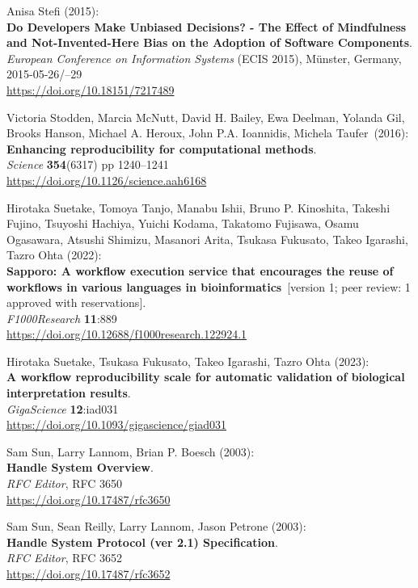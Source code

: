\begin{thebibliography}{9}
Anisa Stefi (2015): \\
\textbf{Do Developers Make Unbiased Decisions? - The Effect of Mindfulness and Not-Invented-Here Bias on the Adoption of Software Components}. \\
\emph{European Conference on Information Systems} (ECIS 2015), Münster, Germany, 2015-05-26/--29 \\
\url{https://doi.org/10.18151/7217489}

Victoria Stodden, Marcia McNutt, David H. Bailey, Ewa Deelman,
Yolanda Gil, Brooks Hanson, Michael A. Heroux, John P.A. Ioannidis,
Michela Taufer~(2016):\\
\textbf{Enhancing reproducibility for computational methods}.\\
\emph{Science} \textbf{354}(6317) pp 1240--1241\\
\url{https://doi.org/10.1126/science.aah6168}

Hirotaka Suetake, Tomoya Tanjo, Manabu Ishii, Bruno
P. Kinoshita, Takeshi Fujino, Tsuyoshi Hachiya, Yuichi Kodama, Takatomo
Fujisawa, Osamu Ogasawara, Atsushi Shimizu, Masanori Arita, Tsukasa
Fukusato, Takeo Igarashi, Tazro Ohta (2022):\\
\textbf{Sapporo: A workflow execution service that encourages the reuse
of workflows in various languages in bioinformatics}~[version 1; peer review: 1 approved with reservations].\\
\emph{F1000Research} \textbf{11}:889\\
\url{https://doi.org/10.12688/f1000research.122924.1}

Hirotaka Suetake, Tsukasa Fukusato, Takeo Igarashi, Tazro Ohta (2023):\\
\textbf{A workflow reproducibility scale for automatic validation of biological interpretation results}.\\
\emph{GigaScience} \textbf{12}:iad031\\
\url{https://doi.org/10.1093/gigascience/giad031}

Sam Sun, Larry Lannom, Brian P. Boesch (2003): \\
\textbf{Handle System Overview}.\\
\emph{RFC Editor}, RFC 3650\\
\url{https://doi.org/10.17487/rfc3650}

Sam Sun, Sean Reilly, Larry Lannom, Jason Petrone (2003):\\
\textbf{Handle System Protocol (ver 2.1) Specification}.\\
\emph{RFC Editor}, RFC 3652\\
\url{https://doi.org/10.17487/rfc3652}


\end{thebibliography}
